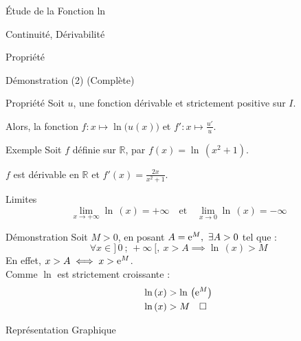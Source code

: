 \documentclass{coursbook}
\begin{document}
\begin{Gpartie}{Étude de la Fonction ln}
\begin{Spartie}{Continuité, Dérivabilité}
\begin{SSpartie}{Propriété}
\begin{SSSpartie}{Démonstration (2) (Complète)}
                \end{SSSpartie}
            \end{SSpartie}
            \begin{SSpartie}{Propriété}
                Soit $u$, une fonction dérivable et strictement positive sur $I$.

                Alors, la fonction $f:x\mapsto\ln\big(u(x)\big)$ et $\boxed{f':x\mapsto\frac{u'}{u}}$.
                \begin{SSSpartie}{Exemple}
                    Soit $f$ définie sur $\mathbb{R}$, par $f(x)=\ln\,(x^2+1)$.

                    $f$ est dérivable en $\mathbb{R}$ et $f'(x)=\frac{2x}{x^2+1}$.
                \end{SSSpartie}
            \end{SSpartie}
        \end{Spartie}
        \begin{Spartie}{Limites}
            \[\boxed{\lim_{x\to+\infty}\ln\,(x)=+\infty\quad\text{et}\quad\lim_{x\to 0}\ln\,(x)=-\infty}\]
            \begin{SSpartie}{Démonstration} 
                Soit $M>0$, en posant $A=\mathrm{e}^M,~\exists A>0$ tel que :
                \[\forall x\in\big]\,0~;\,+\infty~\big[,~x>A\implies\ln\,(x)>M\]
                En effet, $x>A\iff x>\mathrm{e}^M$. \\ Comme $\ln$ est strictement croissante :
                \[\begin{aligned}[t]
                    \ln\,(x)&>\ln\,\left(\mathrm{e}^M\right) \\
                    \ln\,(x)&>M\quad\square
                \end{aligned}\]
            \end{SSpartie}
        \end{Spartie}
        \begin{Spartie}{Représentation Graphique}
            \begin{center}
                \parbox{\linewidth}{}
            \end{center}
        \end{Spartie}
    \end{Gpartie}
\end{document}
